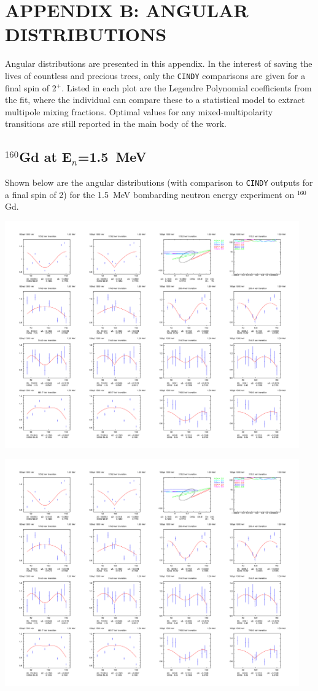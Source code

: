 \chapter{APPENDIX B: ANGULAR DISTRIBUTIONS}
Angular distributions are presented in this appendix. In the interest of saving the lives of countless and precious trees, only the {\tt CINDY} comparisons are given for a final spin of 2$^+$. Listed in each plot are the Legendre Polynomial coefficients from the fit, where the individual can compare these to a statistical model to extract multipole mixing fractions. Optimal values for any mixed-multipolarity transitions are still reported in the main body of the work.
\section{$^{160}$Gd at E$_n$=1.5~MeV}\label{app:AD_Gd_15}
Shown below are the angular distributions (with comparison to {\tt CINDY} outputs for a final spin of 2) for the 1.5~MeV bombarding neutron energy experiment on $^{160}$Gd.
\begin{center}
\includegraphics[page=1,angle=90,width=0.95\textwidth]{160Gd_15_AD_2.pdf}
\end{center}
\begin{center}
\includegraphics[page=2,angle=90,width=0.95\textwidth]{160Gd_15_AD_2.pdf}
\end{center}
